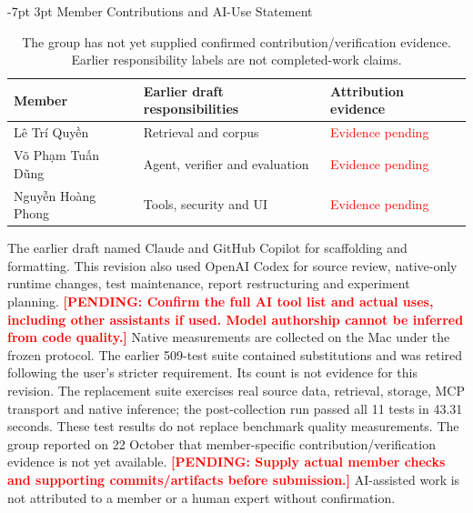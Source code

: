 \documentclass[a4paper,11pt]{article}
\makeatletter
\renewcommand\section{\@startsection{section}{1}{\z@}%
                                   {-7pt \@plus -1pt \@minus -1pt}%
                                   {3pt \@plus 1pt \@minus 1pt}%
                                   {\normalfont\large\bfseries}}
\newcommand{\pending}[1]{\textcolor{red}{\textbf{[PENDING: #1]}}}
\makeatother
\begin{document}
\section{Member Contributions and AI-Use Statement}
\begin{table}[H]\centering\footnotesize
\begin{tabularx}{\textwidth}{@{}L{3.2cm}X L{3.0cm}@{}}
\toprule Member & Earlier draft responsibilities & Attribution evidence\\\midrule
Lê Trí Quyền & Retrieval and corpus & \textcolor{red}{Evidence pending}\\
Võ Phạm Tuấn Dũng & Agent, verifier and evaluation & \textcolor{red}{Evidence pending}\\
Nguyễn Hoàng Phong & Tools, security and UI & \textcolor{red}{Evidence pending}\\
\bottomrule\end{tabularx}
\caption{The group has not yet supplied confirmed contribution/verification evidence. Earlier responsibility labels are not completed-work claims.}
\end{table}
The earlier draft named Claude and GitHub Copilot for scaffolding and formatting. This revision also used OpenAI Codex for source review, native-only runtime changes, test maintenance, report restructuring and experiment planning.
\pending{Confirm the full AI tool list and actual uses, including other assistants if used. Model authorship cannot be inferred from code quality.}
Native measurements are collected on the Mac under the frozen protocol. The earlier 509-test suite contained substitutions and was retired following the user's stricter requirement. Its count is not evidence for this revision. The replacement suite exercises real source data, retrieval, storage, MCP transport and native inference; the post-collection run passed all 11 tests in 43.31 seconds. These test results do not replace benchmark quality measurements.
The group reported on 22 October that member-specific contribution/verification evidence is not yet available. \pending{Supply actual member checks and supporting commits/artifacts before submission.} AI-assisted work is not attributed to a member or a human expert without confirmation.


\end{document}
